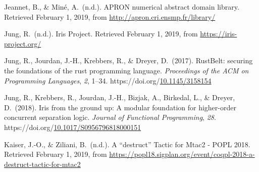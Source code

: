 \documentclass[12pt,twoside]{article}
\begin{document}
{\begin{thebibliography}{222}
\mdbibitemlabel{}Jeannet, B., \& Miné, A.~(n.d.). APRON numerical abstract domain library. Retrieved February 1, 2019, from \href{http://apron.cri.ensmp.fr/library/}{{\ttfamily http://\hspace{0pt}apron.\hspace{0pt}cri.\hspace{0pt}ensmp.\hspace{0pt}fr/\hspace{0pt}library/\hspace{0pt}}}\label{jeannet_apron_nodate}%

\mdbibitemlabel{}Jung, R.~(n.d.). Iris Project. Retrieved February 1, 2019, from \href{https://iris-project.org/}{{\ttfamily https://\hspace{0pt}iris-\hspace{0pt}project.\hspace{0pt}org/\hspace{0pt}}}\label{jung_iris_nodate}%

\mdbibitemlabel{}Jung, R., Jourdan, J.-H., Krebbers, R., \& Dreyer, D.~(2017). RustBelt: securing the foundations of the rust programming language. \emph{Proceedings of the ACM on Programming Languages}, \emph{2}, 1–34. https://doi.org/\href{https://dx.doi.org/10.1145/3158154}{10.1145/3158154}\label{jung_rustbelt:_2017}%

\mdbibitemlabel{}Jung, R., Krebbers, R., Jourdan, J.-H., Bizjak, A., Birkedal, L., \& Dreyer, D.~(2018). Iris from the ground up: A modular foundation for higher-order concurrent separation logic. \emph{Journal of Functional Programming}, \emph{28}. https://doi.org/\href{https://dx.doi.org/10.1017/S0956796818000151}{10.1017/S0956796818000151}\label{jung_iris_2018}%

\mdbibitemlabel{}Kaiser, J.-O., \& Ziliani, B.~(n.d.). A \textquotedblleft{}destruct\textquotedblright{} Tactic for Mtac2 - POPL 2018. Retrieved February 1, 2019, from \href{https://popl18.sigplan.org/event/coqpl-2018-a-destruct-tactic-for-mtac2}{{\ttfamily https://\hspace{0pt}popl18.\hspace{0pt}sigplan.\hspace{0pt}org/\hspace{0pt}event/\hspace{0pt}coqpl-\hspace{0pt}2018-\hspace{0pt}a-\hspace{0pt}destruct-\hspace{0pt}tactic-\hspace{0pt}for-\hspace{0pt}mtac2}}\label{kaiser_destruct_nodate}%


\end{thebibliography}}
\end{document}

